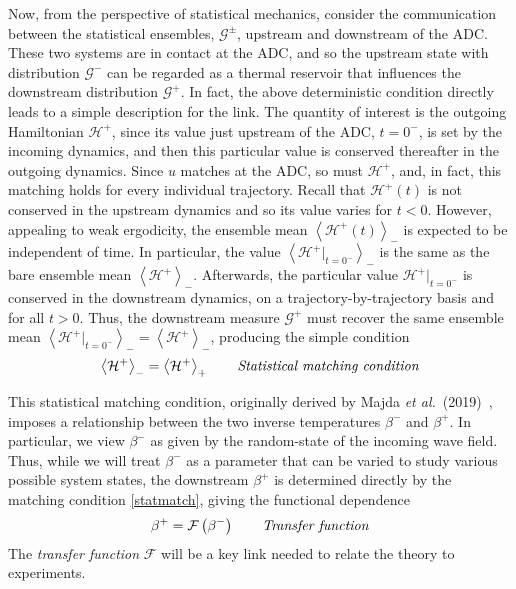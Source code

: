 \documentclass[11pt]{article}
\newcommand{\mean}[1]{\left< #1 \right>}
\newcommand{\Ham}{\mathcal{H}}
\newcommand{\Hdn}{\Ham^{+}}
\newcommand{\Gibbs}{\mathcal{G}}
\newcommand{\Gup}{\Gibbs^{-}}
\newcommand{\Gdn}{\Gibbs^{+}}
\newcommand{\Gupdn}{\Gibbs^{\pm}}
\newcommand{\invtemp}{\beta}
\newcommand{\itup}{\invtemp^{-}}
\newcommand{\itdn}{\invtemp^{+}}
\newcommand{\meanup}[1]{\mean{#1}_{-}}
\newcommand{\meandn}[1]{\mean{#1}_{+}}
\newcommand{\transf}{\mathcal{F}}
\newcommand{\maetal}{Majda {\it et al.}~(2019)~}
\begin{document}
	Now, from the perspective of statistical mechanics, consider the communication between the statistical ensembles, $\Gupdn$, upstream and downstream of the ADC. These two systems are in contact at the ADC, and so the upstream state with distribution $\Gup$ can be regarded as a thermal reservoir that influences the downstream distribution $\Gdn$. In fact, the above deterministic  condition directly leads to a simple description for the link. The quantity of interest is the outgoing Hamiltonian $\Hdn$, since its value just upstream of the ADC, $t=0^{-}$, is set by the incoming dynamics, and then this particular value is conserved thereafter in the outgoing dynamics. Since $u$ matches at the ADC, so must $\Hdn$, and, in fact, this matching holds for every individual trajectory. Recall that $\Hdn(t)$ is not conserved in the upstream dynamics and so its value varies for $t < 0$. However, appealing to weak ergodicity, the ensemble mean $\meanup{\Hdn(t)}$ is expected to be independent of time. In particular, the value $\meanup{\Hdn \vert_{t=0^{-}} }$ is the same as the bare ensemble mean $\meanup{\Hdn}$. Afterwards, the particular value $\Hdn \vert_{t=0^{-}}$ is conserved in the downstream dynamics, on a trajectory-by-trajectory basis and for all $t>0$. Thus, the downstream measure $\Gdn$ must recover the same ensemble mean $\meanup{\Hdn \vert_{t=0^{-}} } = \meanup{\Hdn}$, producing the simple condition
\begin{align}
\label{statmatch}
\meanup{\Hdn} = \meandn{\Hdn}
\qquad \mbox{\em Statistical matching condition}
\end{align}

	This statistical matching condition, originally derived by \maetal \cite{majda2019}, imposes a relationship between the two inverse temperatures $\itup$ and $\itdn$. In particular, we view $\itup$ as given by the random-state of the incoming wave field. Thus, while we will treat $\itup$ as a parameter that can be varied to study various possible system states, the downstream $\itdn$ is determined directly by the matching condition \eqref{statmatch}, giving the functional dependence
\begin{equation}
\itdn = \transf \left( \itup \right)
\qquad \mbox{\em Transfer function}
\end{equation}
The {\em transfer function} $\transf$ will be a key link needed to relate the theory to experiments.

\end{document}
